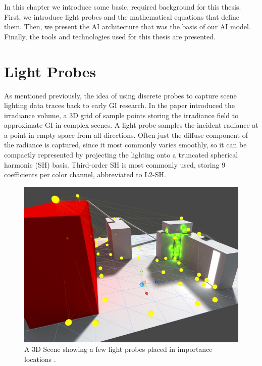In this chapter we introduce some basic, required background for this thesis. First, we introduce light probes and the mathematical equations that define them. Then, we present the AI architecture that was the basis of our AI model. Finally, the tools and technologies used for this thesis are presented.

\section{Light Probes}
As mentioned previously, the idea of using discrete probes to capture scene lighting data traces back to early GI research. In the paper \parencite{Greger1998} introduced the irradiance volume, a 3D grid of sample points storing the irradiance field to approximate GI in complex scenes. A light probe samples the incident radiance at a point in empty space from all directions. Often just the diffuse component of the radiance is captured, since it most commonly varies smoothly, so it can be compactly represented by projecting the lighting onto a truncated spherical harmonic (SH) basis. Third-order SH is most commonly used, storing 9 coefficients per color channel, abbreviated to L2-SH.

\begin{figure}[h]
	\centering
	\includegraphics[scale=0.5]{Graphics/light_probes.jpg}
	\caption{A 3D Scene showing a few light probes placed in importance locations \parencite{Unity2016}.}
	\label{fig:Light_probes}
\end{figure}


